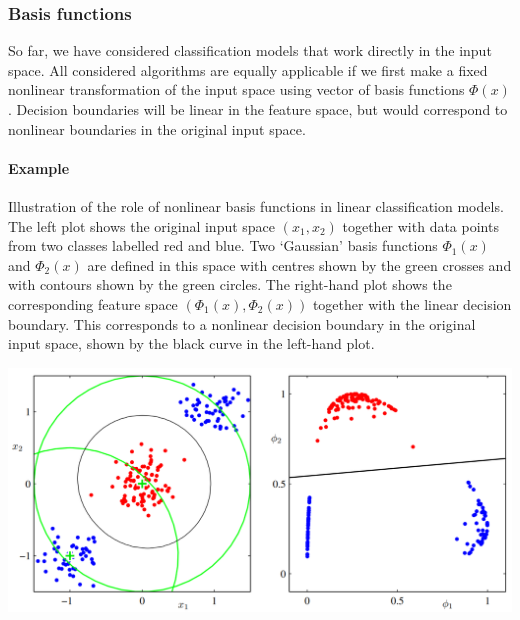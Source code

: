\documentclass[main.tex]{subfiles}
\begin{document}
\newpage
\subsubsection{Basis functions}
So far, we have considered classification models that work directly in the input space. All considered algorithms are equally applicable if we first make a fixed nonlinear transformation of the input space using vector of basis functions $\Phi(x)$. Decision boundaries will be linear in the feature space, but would correspond to nonlinear boundaries in the original input space.
\paragraph{Example}
Illustration of the role of nonlinear basis functions in linear classification models. The left plot shows the original input space $(x_1, x_2)$ together with data points from two classes labelled red and blue. Two
‘Gaussian’ basis functions $\Phi_1(x)$ and $\Phi_2(x)$ are defined in this space with centres shown by the green crosses
and with contours shown by the green circles. The right-hand plot shows the corresponding feature space $(\Phi_1(x), \Phi_2(x))$ together with the linear decision boundary. This corresponds to a nonlinear decision boundary in the original input space, shown by the black curve in the left-hand plot.
\begin{center}
    \includegraphics[scale=0.50]{img/LS_Gaussian_Basis.PNG}
\end{center}
\end{document}
